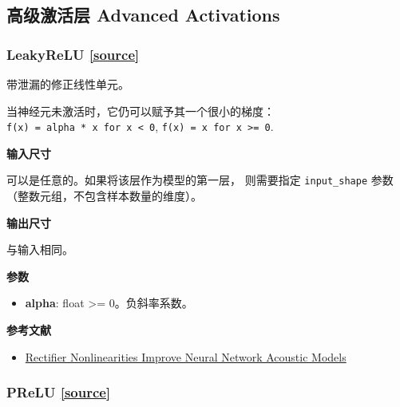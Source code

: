 \subsection{高级激活层 Advanced Activations}\label{advanced-activations}

    
\subsubsection{LeakyReLU {\href{https://github.com/keras-team/keras/blob/master/keras/layers/advanced_activations.py\#L18}{{[}source{]}}}}

\begin{Shaded}
\begin{Highlighting}[]
\OperatorTok{=}\NormalTok{)}
\end{Highlighting}
\end{Shaded}

带泄漏的修正线性单元。

当神经元未激活时，它仍可以赋予其一个很小的梯度：
\texttt{f(x)\ =\ alpha\ *\ x\ for\ x\ \textless{}\ 0},
\texttt{f(x)\ =\ x\ for\ x\ \textgreater{}=\ 0}.

\textbf{输入尺寸}

可以是任意的。如果将该层作为模型的第一层， 则需要指定
\texttt{input\_shape} 参数 （整数元组，不包含样本数量的维度）。

\textbf{输出尺寸}

与输入相同。

\textbf{参数}

\begin{itemize}
\tightlist
\item
  \textbf{alpha}: float \textgreater{}= 0。负斜率系数。
\end{itemize}

\textbf{参考文献}

\begin{itemize}
\tightlist
\item
  \href{https://web.stanford.edu/~awni/papers/relu_hybrid_icml2013_final.pdf}{Rectifier
  Nonlinearities Improve Neural Network Acoustic Models}
\end{itemize}




\subsubsection{PReLU {\href{https://github.com/keras-team/keras/blob/master/keras/layers/advanced_activations.py\#L57}{{[}source{]}}}}

